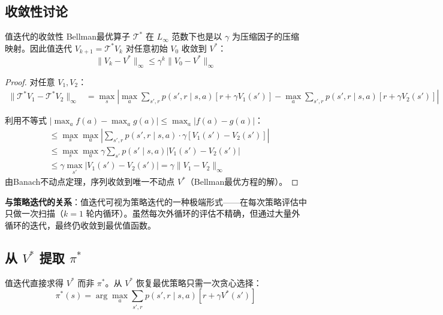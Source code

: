 \subsection{收敛性讨论}

\begin{myTheorem}{值迭代的收敛性}
Bellman最优算子 $\mathcal{T}^{*}$ 在 $L_\infty$ 范数下也是以 $\gamma$ 为压缩因子的压缩映射。因此值迭代 $V_{k+1} = \mathcal{T}^{*} V_k$ 对任意初始 $V_0$ 收敛到 $V^{*}$：
\[
\|V_k - V^{*}\|_\infty \le \gamma^k \|V_0 - V^{*}\|_\infty
\]
\end{myTheorem}

\begin{proof}
对任意 $V_1, V_2$：
\begin{align*}
\| \mathcal{T}^{*} V_1 - \mathcal{T}^{*} V_2 \|_\infty &= \max_s \left| \max_a \sum_{s', r} p(s', r \mid s, a) [r + \gamma V_1(s')] - \max_a \sum_{s', r} p(s', r \mid s, a) [r + \gamma V_2(s')] \right|
\end{align*}

利用不等式 $|\max_a f(a) - \max_a g(a)| \le \max_a |f(a) - g(a)|$：
\begin{align*}
&\le \max_s \max_a \left| \sum_{s', r} p(s', r \mid s, a) \cdot \gamma [V_1(s') - V_2(s')] \right| \\
&\le \max_s \max_a \gamma \sum_{s'} p(s' \mid s, a) |V_1(s') - V_2(s')| \\
&\le \gamma \max_{s'} |V_1(s') - V_2(s')| = \gamma \|V_1 - V_2\|_\infty
\end{align*}
由Banach不动点定理，序列收敛到唯一不动点 $V^{*}$（Bellman最优方程的解）。
\end{proof}

\textbf{与策略迭代的关系}：值迭代可视为策略迭代的一种极端形式——在每次策略评估中只做一次扫描（$k=1$ 轮内循环）。虽然每次外循环的评估不精确，但通过大量外循环的迭代，最终仍收敛到最优值函数。

\subsection{从 $V^{*}$ 提取 $\pi^{*}$}

值迭代直接求得 $V^{*}$ 而非 $\pi^{*}$。从 $V^{*}$ 恢复最优策略只需一次贪心选择：
\[
\pi^{*}(s) = \arg\max_{a} \sum_{s', r} p(s', r \mid s, a) [r + \gamma V^{*}(s')]
\]

